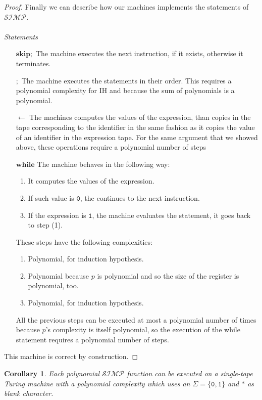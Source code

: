 \documentclass[10pt]{amsart}
\newcommand{\SIMP}{\mathcal{SIMP}}
\newcommand{\zero}{\mathtt{0}}
\newcommand{\one}{\mathtt{1}}
\newcommand{\sk}{\mathbf{skip};}
\newcommand{\takes}{\leftarrow}
\newtheorem{corollary}{Corollary}
\begin{document}
\begin{proof}
Finally we can describe how our machines implements the statements of $\SIMP$.
\\\\
\emph{Statements}
\begin{itemize}
\item[$\sk$] The machine executes the next instruction, if it exists, otherwise it terminates.
\item[$;$] The machine executes the statements in their order. This requires a polynomial complexity for IH and because the sum of polynomials is a polynomial.
\item[$\takes $] The machines computes the values of the expression, than copies in the tape corresponding to the identifier in the same fashion as it copies the value of an identifier in the expression tape. For the same argument that we showed above, these operations require a polynomial number of steps
\item[$\mathbf{while}$] The machine behaves in the following way:
\begin{enumerate}
\item It computes the values of the expression.
\item If such value is $\zero$, the continues to the next instruction.
\item If the expression is $\one$, the machine evaluates the statement, it goes back to step (1).
\end{enumerate}
These steps have the following complexities:
\begin{enumerate}
\item Polynomial, for induction hypothesis.
\item Polynomial because $p$ is polynomial and so the size of the register is polynomial, too.
\item Polynomial, for induction hypothesis.
\end{enumerate}
All the previous steps can be executed at most a polynomial number of times because $p$'s complexity is itself polynomial, so the execution of the while statement requires a polynomial number of steps.
\end{itemize}

This machine is correct by construction.
\end{proof}

\begin{corollary}
Each polynomial $\SIMP$ function can be executed on a single-tape Turing machine with a polynomial complexity which uses an $\Sigma=\{\zero, \one\}$ and $*$ as blank character.
\end{corollary}
\end{document}
